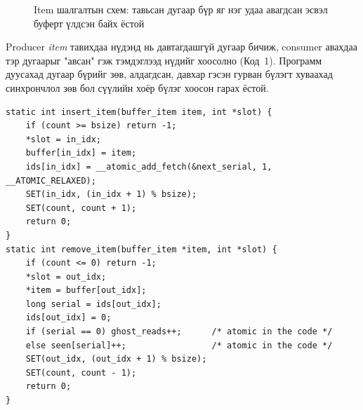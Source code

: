 \documentclass[12pt,a4paper]{article}
\newcommand{\term}[1]{\textit{#1}} %
\begin{document}
\begin{figure}[H]\centering
{}
\caption{Item шалгалтын схем: тавьсан дугаар бүр яг нэг удаа авагдсан эсвэл буферт үлдсэн байх ёстой}\label{fig:items}
\end{figure}

Producer \term{item} тавихдаа нүдэнд нь давтагдашгүй дугаар бичиж, consumer авахдаа тэр дугаарыг "авсан" гэж тэмдэглээд нүдийг хоосолно (Код~1). Программ дуусахад дугаар бүрийг зөв, алдагдсан, давхар гэсэн гурван бүлэгт хуваахад синхрончлол зөв бол сүүлийн хоёр бүлэг хоосон гарах ёстой.

\begin{lstlisting}[title={\textbf{Код 1.} Дугаартай \texttt{insert\_item}, \texttt{remove\_item} (src/core/pc.c, товчилсон)}]
static int insert_item(buffer_item item, int *slot) {
    if (count >= bsize) return -1;
    *slot = in_idx;
    buffer[in_idx] = item;
    ids[in_idx] = __atomic_add_fetch(&next_serial, 1, __ATOMIC_RELAXED);
    SET(in_idx, (in_idx + 1) % bsize);
    SET(count, count + 1);
    return 0;
}
static int remove_item(buffer_item *item, int *slot) {
    if (count <= 0) return -1;
    *slot = out_idx;
    *item = buffer[out_idx];
    long serial = ids[out_idx];
    ids[out_idx] = 0;
    if (serial == 0) ghost_reads++;      /* atomic in the code */
    else seen[serial]++;                 /* atomic in the code */
    SET(out_idx, (out_idx + 1) % bsize);
    SET(count, count - 1);
    return 0;
}
\end{lstlisting}
\end{document}
